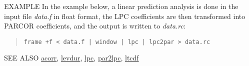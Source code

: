 \begin{options}
\end{options}

\begin{qsection}{EXAMPLE}
In the example below, a linear prediction analysis is
done in the input file {\em data.f} in float format,
the LPC coefficients are then transformed into PARCOR coefficients,
and the output is written to {\em data.rc}:
\begin{quote}
 \verb!frame +f < data.f | window | lpc | lpc2par > data.rc!
\end{quote} 
\end{qsection}

\begin{qsection}{SEE ALSO}
\hyperlink{acorr}{acorr},
\hyperlink{levdur}{levdur},
\hyperlink{lpc}{lpc},
\hyperlink{par2lpc}{par2lpc},
\hyperlink{ltcdf}{ltcdf}
\end{qsection}
